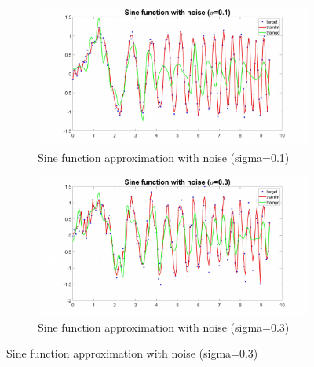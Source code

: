 \documentclass{article}
\begin{document}
\begin{figure}[h!]
\begin{subfigure}[b]{.49\textwidth}
  \centering
  \includegraphics[width=\linewidth]{lab1/error1.pdf}
  \caption{Sine function approximation with noise (sigma=0.1)}
  \label{fig:noise1}
\end{subfigure}
\hfill
\begin{subfigure}[b]{.49\textwidth}
  \centering
  \includegraphics[width=\linewidth]{lab1/error3.pdf}
  \caption{Sine function approximation with noise (sigma=0.3)}
  \label{fig:noise3}
\end{subfigure}


\end{figure}
\end{document}
